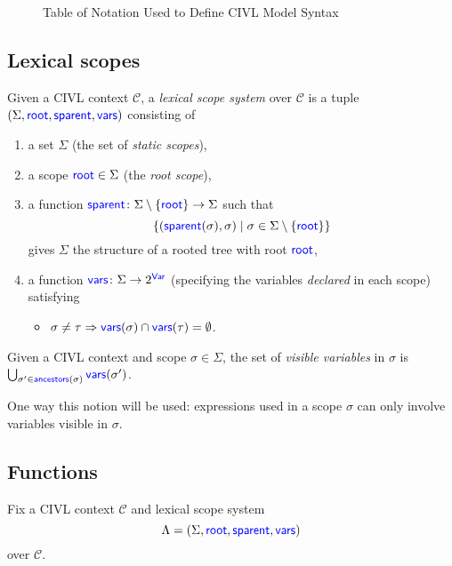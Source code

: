 \documentclass[11pt]{book}
\begin{document}
\begin{figure}
  \notationtable
  \caption{Table of Notation Used to Define CIVL Model Syntax}
  \label{fig:notation}
\end{figure}

\subsection{Lexical scopes}
\label{sec:scopes}

\begin{definition}
  Given a CIVL context $\mathcal{C}$, a \emph{lexical scope system}
  over $\mathcal{C}$ is a tuple $(\Sigma,\textsf{\textcolor{blue}{\textup{root}}},\textsf{\textcolor{blue}{\textup{sparent}}},\textsf{\textcolor{blue}{\textup{vars}}})$
  consisting of
  \begin{enumerate}
  \item a set $\Sigma$ (the set of \emph{static scopes}),
  \item a scope $\textsf{\textcolor{blue}{\textup{root}}}\in\Sigma$ (the  \emph{root scope}),
  \item a function
    $\textsf{\textcolor{blue}{\textup{sparent}}}\colon\Sigma\setminus\{\textsf{\textcolor{blue}{\textup{root}}}\}\rightarrow
    \Sigma$ such that 
    \[\{(\textsf{\textcolor{blue}{\textup{sparent}}}(\sigma),\sigma)\mid \sigma\in\Sigma\setminus\{\textsf{\textcolor{blue}{\textup{root}}}\}\}\]
    gives $\Sigma$ the structure of a rooted tree with root $\textsf{\textcolor{blue}{\textup{root}}}$,
  \item a function $\textsf{\textcolor{blue}{\textup{vars}}}\colon\Sigma\rightarrow 2^{\textsf{\textcolor{blue}{\textup{Var}}}}$ 
    (specifying the variables \emph{declared} in each scope) satisfying
    \begin{itemize}
    \item $\sigma\neq\tau\Rightarrow \textsf{\textcolor{blue}{\textup{vars}}}(\sigma)\cap \textsf{\textcolor{blue}{\textup{vars}}}(\tau)=\emptyset$.
    \end{itemize}
  \end{enumerate}
\end{definition}

\begin{definition}
  Given a CIVL context and scope $\sigma\in\Sigma$,
  the set of \emph{visible variables} in $\sigma$
  is $\bigcup_{\sigma'\in\textsf{\textcolor{blue}{\textup{ancestors}}}(\sigma)}\textsf{\textcolor{blue}{\textup{vars}}}(\sigma')$.
\end{definition}

One way this notion will be used: expressions used in a scope $\sigma$
can only involve variables visible in $\sigma$.

\subsection{Functions}
\label{sec:functions}

Fix a CIVL context $\mathcal{C}$ and lexical scope system
\[\Lambda=(\Sigma,\textsf{\textcolor{blue}{\textup{root}}},\textsf{\textcolor{blue}{\textup{sparent}}},\textsf{\textcolor{blue}{\textup{vars}}})\] over $\mathcal{C}$.
\end{document}
